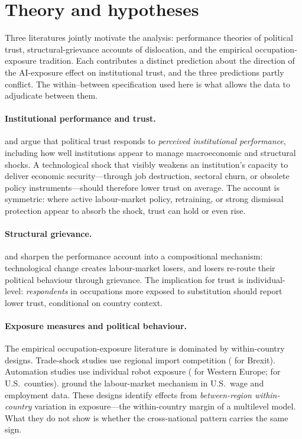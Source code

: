 \section{Theory and hypotheses}\label{sec:theory}

Three literatures jointly motivate the analysis: performance theories of
political trust, structural-grievance accounts of dislocation, and the
empirical occupation-exposure tradition. Each contributes a distinct
prediction about the direction of the AI-exposure effect on
institutional trust, and the three predictions partly conflict. The
within--between specification used here is what allows the data to
adjudicate between them.

\paragraph{Institutional performance and trust.}
\citet{Hetherington1998} and \citet{vanderMeer2017} argue that political
trust responds to \emph{perceived institutional performance}, including
how well institutions appear to manage macroeconomic and structural
shocks. A technological shock that visibly weakens an institution's
capacity to deliver economic security---through job destruction, sectoral
churn, or obsolete policy instruments---should therefore lower trust on
average. The account is symmetric: where active labour-market policy,
retraining, or strong dismissal protection appear to absorb the shock,
trust can hold or even rise.

\paragraph{Structural grievance.}
\citet{GidronHall2017} and \citet{Kurer2020} sharpen the performance
account into a compositional mechanism: technological change creates
labour-market losers, and losers re-route their political behaviour
through grievance. The implication for trust is individual-level:
\emph{respondents} in occupations more exposed to substitution should
report lower trust, conditional on country context.

\paragraph{Exposure measures and political behaviour.}
The empirical occupation-exposure literature is dominated by
within-country designs. Trade-shock studies use regional import
competition (\citealt{ColantoneStanig2018} for Brexit). Automation
studies use individual robot exposure
(\citealt{AnelliColantoneStanig2021} for Western Europe;
\citealt{FreyBergerChen2018} for U.S.\ counties). \citet{AcemogluRestrepo2020}
ground the labour-market mechanism in U.S.\ wage and employment data.
These designs identify effects from \emph{between-region within-country}
variation in exposure---the within-country margin of a multilevel model.
What they do not show is whether the cross-national pattern carries the
same sign.

